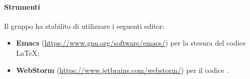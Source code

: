                 \paragraph*{Strumenti}
                Il gruppo ha stabilito di utilizzare i seguenti editor:
                \begin{itemize}
                  \item \textbf{Emacs} (\url{https://www.gnu.org/software/emacs/}) per la stesura del codice \LaTeX; 
                  \item \textbf{WebStorm} (\url{https://www.jetbrains.com/webstorm/}) per il codice .
                \end{itemize}
